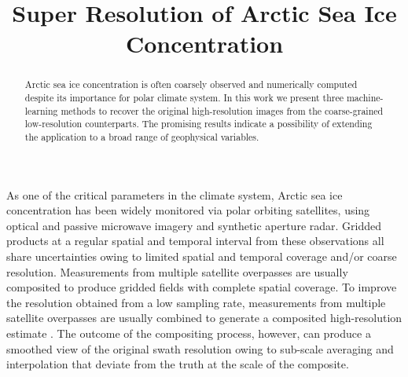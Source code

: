 \documentclass[]{copernicus}
\begin{document}
\title{Super Resolution of Arctic Sea Ice Concentration}









\received{}
\pubdiscuss{} %
\revised{}
\accepted{}
\published{}



\maketitle

\begin{abstract}
Arctic sea ice concentration is often coarsely observed and numerically computed despite its importance for polar climate system. In this work we present three machine-learning methods to recover the original high-resolution images from the coarse-grained low-resolution counterparts. The promising results indicate a possibility of extending the application to a broad range of geophysical variables.
\end{abstract}


\introduction 
As one of the critical parameters in the climate system, Arctic sea ice concentration has been widely monitored via polar orbiting satellites, using optical and passive microwave imagery and synthetic aperture radar. Gridded products at a regular spatial and temporal interval from these observations all share uncertainties owing to limited spatial and temporal coverage and/or coarse resolution. Measurements from multiple satellite overpasses are usually composited to produce gridded fields with complete spatial coverage. 
To improve the resolution obtained from a low sampling rate, measurements from multiple satellite overpasses are usually combined to generate a composited high-resolution estimate \citep{drue2004high,fraser2010generation,meierstewart2020}. The outcome of the compositing process, however, can produce a smoothed view of the original swath resolution owing to sub-scale averaging and interpolation that deviate from the truth at the scale of the composite.
\end{document}
